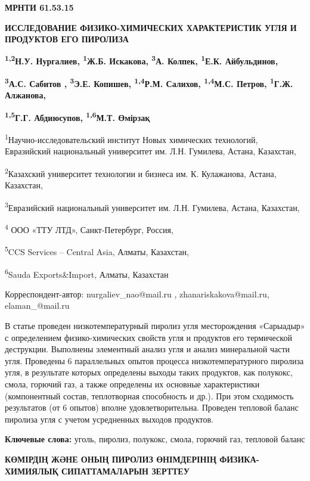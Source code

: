 \newpage
{\bfseries МРНТИ 61.53.15}

{\bfseries ИССЛЕДОВАНИЕ ФИЗИКО-ХИМИЧЕСКИХ ХАРАКТЕРИСТИК УГЛЯ И ПРОДУКТОВ
ЕГО ПИРОЛИЗА}

{\bfseries \textsuperscript{1,2}Н.У. Нургалиев, \textsuperscript{1}Ж.Б.
Искакова, \textsuperscript{3}А. Колпек, \textsuperscript{1}Е.К.
Айбульдинов,}

{\bfseries \textsuperscript{3}А.С. Сабитов , \textsuperscript{3}Э.Е.
Копишев, \textsuperscript{1,4}Р.М. Салихов, \textsuperscript{1,4}М.С.
Петров, \textsuperscript{1}Г.Ж. Алжанова,}

{\bfseries \textsuperscript{1,5}Г.Г. Абдиюсупов, \textsuperscript{1,6}М.Т.
Өмірзақ}

\textsuperscript{1}Научно-исследовательский институт Новых химических
технологий, Евразийский национальный университет им. Л.Н. Гумилева,
Астана, Казахстан,

\textsuperscript{2}Казахский университет технологии и бизнеса им. К.
Кулажанова, Астана, Казахстан,

\textsuperscript{3}Евразийский национальный университет им. Л.Н.
Гумилева, Астана, Казахстан,

\textsuperscript{4} ООО «ТТУ ЛТД», Санкт-Петербург, Россия,

\textsuperscript{5}CCS Services -- Central Asia, Алматы, Казахстан,

\textsuperscript{6}Sauda Exports\&Import, Алматы, Казахстан

Корреспондент-автор: nurgaliev\_nao@mail.ru , zhanariskakova@mail.ru,
elaman\_@mail.ru

В статье проведен низкотемпературный пиролиз угля месторождения
«Сарыадыр» с определением физико-химических свойств угля и продуктов его
термической деструкции. Выполнены элементный анализ угля и анализ
минеральной части угля. Проведены 6 параллельных опытов процесса
низкотемпературного пиролиза угля, в результате которых определены
выходы таких продуктов, как полукокс, смола, горючий газ, а также
определены их основные характеристики (компонентный состав, теплотворная
способность и др.). При этом сходимость результатов (от 6 опытов) вполне
удовлетворительна. Проведен тепловой баланс пиролиза угля с учетом
усредненных выходов продуктов.

{\bfseries Ключевые слова:} уголь, пиролиз, полукокс, смола, горючий газ,
тепловой баланс

{\bfseries КӨМІРДІҢ ЖӘНЕ ОНЫҢ ПИРОЛИЗ ӨНІМДЕРІНІҢ ФИЗИКА-ХИМИЯЛЫҚ
СИПАТТАМАЛАРЫН ЗЕРТТЕУ}

